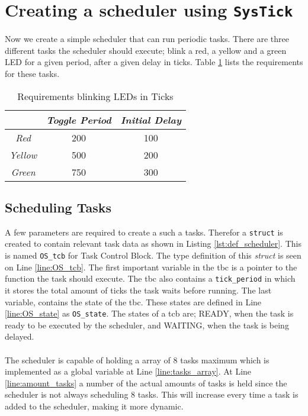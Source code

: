 \section{Creating a scheduler using \texttt{SysTick} }
Now we create a simple scheduler that can run periodic tasks. There are three different tasks the scheduler
should execute; blink a red, a yellow and a green LED for a given period, after a 
given delay in ticks. Table \ref{tab:led_schedule} lists the requirements for these tasks.

\begin{table}[H]
    \centering
    \begin{tabular}{|c|c|c|}
        \hline
         & \textcolor{darkpink}{\textit{Toggle Period}} & \textcolor{darkpink}{\textit{Initial Delay}}\\
        \hline
        \textit{Red} & 200 & 100 \\
        \hline
        \textit{Yellow} & 500 & 200 \\
        \hline
        \textit{Green} & 750 & 300 \\
        \hline
    \end{tabular}
        
    \label{tab:led_schedule}
    \caption{Requirements blinking LEDs in Ticks}
\end{table}


\subsection{Scheduling Tasks}
A few parameters are required to create a such a tasks. Therefor a \texttt{struct} is created to contain
relevant task data as shown in Listing \ref{lst:def_scheduler}. This is named \texttt{OS\_tcb} for Task Control Block. The type definition of this \textit{struct} is seen on Line \ref{line:OS_tcb}.
The first important variable in the tbc is a pointer to the function the task should execute. The tbc also contains
a \texttt{tick\_period} in which it stores the total amount of ticks the task waits before running. The last variable,
contains the state of the tbc. These states are defined in Line \ref{line:OS_state} as \texttt{OS\_state}. The states of a 
tcb are; READY, when the task is ready to be executed by the scheduler, and WAITING, when the task is being delayed.
\\\\
The scheduler is capable of holding a array of 8 tasks maximum which is implemented as a global variable at Line
\ref{line:tasks_array}. At Line \ref{line:amount_tasks} a number of the actual amounts of tasks is held since the scheduler is not always scheduling 8 tasks. This will
increase every time a task is added to the scheduler, making it more dynamic. 

